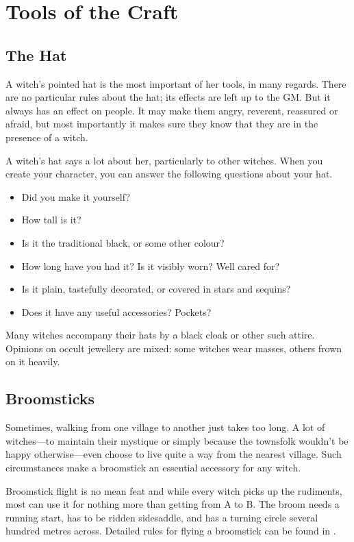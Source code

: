 \chapter{Tools of the Craft}

\section{The Hat}

A witch's pointed hat is the most important of her tools, in many regards.
There are no particular rules about the hat; its effects are left up to the GM.
But it always has an effect on people.
It may make them angry, reverent, reassured or afraid, but most importantly it makes sure they know that they are in the presence of a witch.

A witch's hat says a lot about her, particularly to other witches.
When you create your character, you can answer the following questions about your hat.

\begin{itemize}
	\item Did you make it yourself?
	\item How tall is it?
	\item Is it the traditional black, or some other colour?
	\item How long have you had it?
		Is it visibly worn?
		Well cared for?
	\item Is it plain, tastefully decorated, or covered in stars and sequins?
	\item Does it have any useful accessories?
		Pockets?
\end{itemize}

Many witches accompany their hats by a black cloak or other such attire.
Opinions on occult jewellery are mixed: some witches wear masses, others frown on it heavily.



\section{Broomsticks}

Sometimes, walking from one village to another just takes too long.
A lot of witches---to maintain their mystique or simply because the townsfolk wouldn't be happy otherwise---even choose to live quite a way from the nearest village.
Such circumstances make a broomstick an essential accessory for any witch.

Broomstick flight is no mean feat and while every witch picks up the rudiments, most can use it for nothing more than getting from A to B.
The broom needs a running start, has to be ridden sidesaddle, and has a turning circle several hundred metres across.
Detailed rules for flying a broomstick can be found in .

